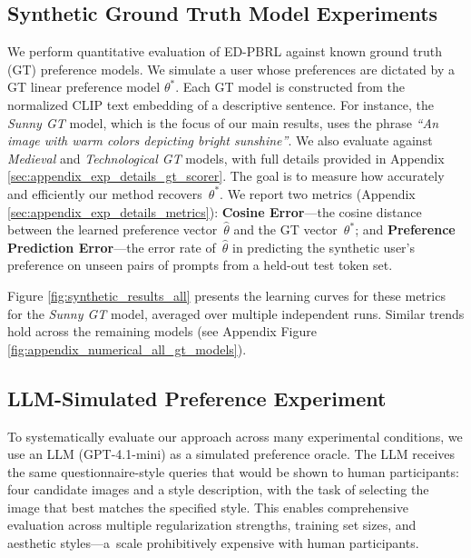 \documentclass{article}
\begin{document}
\vspace{-0.2cm}  \subsection{Synthetic Ground Truth Model Experiments}
\label{sec:synthetic_gt_model_experiments_main}
We perform quantitative evaluation of ED-PBRL against known ground truth (GT) preference models. We simulate a user whose preferences are dictated by a GT linear preference model $\theta^*$. Each GT model is constructed from the normalized CLIP text embedding of a descriptive sentence. For instance, the \emph{Sunny GT} model, which is the focus of our main results, uses the phrase \textit{``An image with warm colors depicting bright sunshine''}. We also evaluate against \emph{Medieval} and \emph{Technological GT} models, with full details provided in Appendix \ref{sec:appendix_exp_details_gt_scorer}. The goal is to measure how accurately and efficiently our method recovers~$\theta^*$. We report two metrics (Appendix \ref{sec:appendix_exp_details_metrics}): \textbf{Cosine Error}---the cosine distance between the learned preference vector~$\hat{\theta}$ and the GT vector~$\theta^*$; and \textbf{Preference Prediction Error}---the error rate of~$\hat{\theta}$ in predicting the synthetic user's preference on unseen pairs of prompts from a held-out test token set.


Figure \ref{fig:synthetic_results_all} presents the learning curves for these metrics for the \emph{Sunny GT} model, averaged over multiple independent runs.
Similar trends hold across the remaining models (see Appendix Figure \ref{fig:appendix_numerical_all_gt_models}).

\vspace{-0.2cm} \subsection{LLM-Simulated Preference Experiment}
\label{sec:llm_feedback_experiment_main}
\vspace{-0.2cm} To systematically evaluate our approach across many experimental conditions, we use an LLM (GPT-4.1-mini) as a simulated preference oracle. The LLM receives the same questionnaire-style queries that would be shown to human participants: four candidate images and a style description, with the task of selecting the image that best matches the specified style. This enables comprehensive evaluation across multiple regularization strengths, training set sizes, and aesthetic styles---a~scale prohibitively expensive with human participants.
\end{document}
